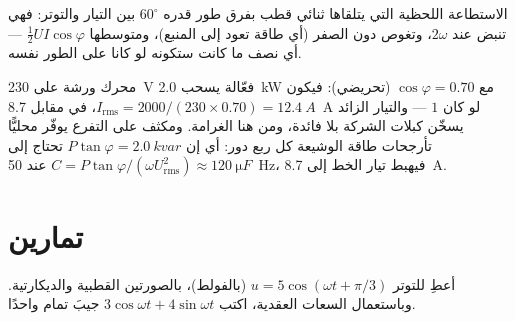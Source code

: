 \begin{omfigure}

{\small الاستطاعة اللحظية التي يتلقاها ثنائي قطب بفرق طور قدره $60^\circ$
بين التيار والتوتر: فهي تنبض عند $2\omega$، وتغوص دون الصفر
(أي طاقة تعود إلى المنبع)، ومتوسطها $\tfrac12 UI\cos\varphi$
--- أي نصف ما كانت ستكونه لو كانا على الطور نفسه.}
\end{omfigure}

\begin{example}\label{ex:b1:sinusoidal-impedance:pf}
محرك ورشة على \qty{230}{V} فعّالة يسحب \qty{2.0}{kW} مع
$\cos\varphi = 0.70$ (تحريضي): فيكون $I_{\mathrm{rms}} = 2000/(230 \times
0.70) = \qty{12.4}{A}$، في مقابل \qty{8.7}{A} لو كان 
$1$ --- والتيار الزائد يسخّن كبلات الشركة بلا فائدة، ومن هنا
الغرامة. ومكثف على التفرع يوفّر محليًّا تأرجحات طاقة الوشيعة كل ربع
دور: أي إن \emph{} $P\tan\varphi =
\qty{2.0}{kvar}$ تحتاج إلى $C = P\tan\varphi/(\omega U_{\mathrm{rms}}^2)
\approx \qty{120}{\micro F}$ عند \qty{50}{Hz}، فيهبط تيار الخط
إلى \qty{8.7}{A}.
\end{example}

\section{تمارين}

\begin{exercise}[$\star$]\label{exo:b1:sinusoidal-impedance:1}
أعطِ  للتوتر $u = 5\cos(\omega t + \pi/3)$ (بالفولط)، بالصورتين
القطبية والديكارتية. وباستعمال السعات العقدية، اكتب $3\cos\omega t
+ 4\sin\omega t$ جيبَ تمام واحدًا.
\end{exercise}

